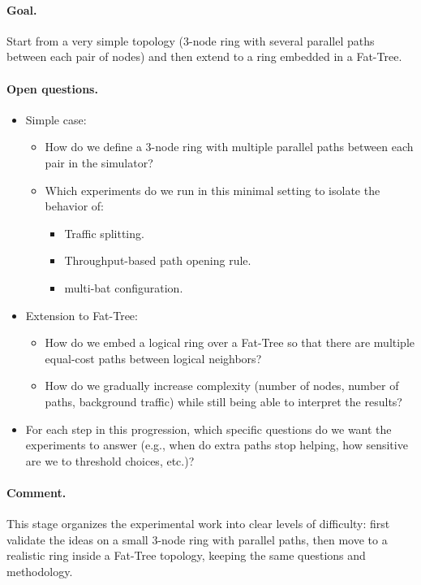 \documentclass[12pt]{article}
\begin{document}
\paragraph{Goal.}
Start from a very simple topology (3-node ring with several parallel paths between each pair of nodes) and then extend to a ring embedded in a Fat-Tree.

\paragraph{Open questions.}
\begin{itemize}[leftmargin=*]
  \item Simple case:
        \begin{itemize}
            \item How do we define a 3-node ring with multiple parallel paths between each pair in the simulator?
            \item Which experiments do we run in this minimal setting to isolate the behavior of:
                  \begin{itemize}
                      \item Traffic splitting.
                      \item Throughput-based path opening rule.
                      \item multi-bat configuration.
                  \end{itemize}
        \end{itemize}
  \item Extension to Fat-Tree:
        \begin{itemize}
            \item How do we embed a logical ring over a Fat-Tree so that there are multiple equal-cost paths between logical neighbors?
            \item How do we gradually increase complexity (number of nodes, number of paths, background traffic) while still being able to interpret the results?
        \end{itemize}
  \item For each step in this progression, which specific questions do we want the experiments to answer (e.g., when do extra paths stop helping, how sensitive are we to threshold choices, etc.)?
\end{itemize}

\paragraph{Comment.}
This stage organizes the experimental work into clear levels of difficulty: first validate the ideas on a small 3-node ring with parallel paths, then move to a realistic ring inside a Fat-Tree topology, keeping the same questions and methodology.
\end{document}
